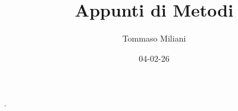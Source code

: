 \documentclass[a4paper, oneside]{article}
\title{Appunti di Metodi}
\author{Tommaso Miliani}
\date{04-02-26}
\begin{document}
                {}          %
                {}          %
                {\slshape}  %
                {}          %
                {\bfseries} %
                {.}         %
                {\newline}  %
                {}          %
\theoremstyle{theoremEnv}

\newtheorem{definition}{Definizione}[section]
\newtheorem{theorem}{Teorema}[section]
\newtheorem{lemma}{Proposizione}[section]
\newtheorem{observation}{Osservazione}[section]
\newtheorem{corollary}{Corollario}[theorem]
\newtheorem{example}{Esempio}[section]
\newtheorem{remark}{Enunciato}[section]

\maketitle
\end{document}
